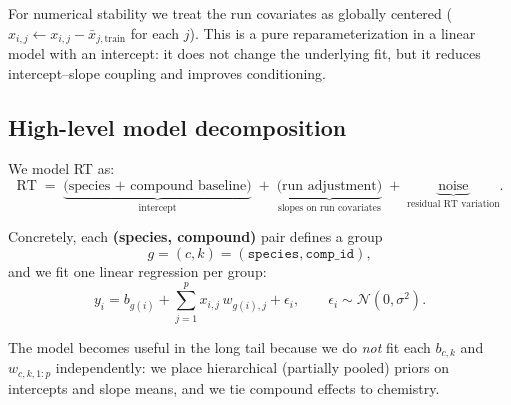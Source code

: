 \documentclass[11pt]{article}
\begin{document}
For numerical stability we treat the run covariates as globally centered
($x_{i,j}\leftarrow x_{i,j} - \bar{x}_{j,\text{train}}$ for each $j$). This is a pure reparameterization in a linear
model with an intercept: it does not change the underlying fit, but it reduces intercept--slope coupling and improves
conditioning.

\subsection{High-level model decomposition}

We model RT as:
\[
  \text{RT} \;=\; \underbrace{\text{(species + compound baseline)}}_{\text{intercept}} \;+\;
  \underbrace{\text{(run adjustment)}}_{\text{slopes on run covariates}} \;+\;
  \underbrace{\text{noise}}_{\text{residual RT variation}}.
\]

Concretely, each \textbf{(species, compound)} pair defines a group
\[
  g = (c, k) = (\texttt{species}, \texttt{comp\_id}),
\]
and we fit one linear regression per group:
\[
  y_i = b_{g(i)} + \sum_{j=1}^{p} x_{i,j}\,w_{g(i),j} + \epsilon_i,\qquad
  \epsilon_i \sim \mathcal{N}(0,\sigma^2).
\]

The model becomes useful in the long tail because we do \emph{not} fit each $b_{c,k}$ and $w_{c,k,1:p}$ independently:
we place hierarchical (partially pooled) priors on intercepts and slope means, and we tie compound effects to chemistry.
\end{document}
